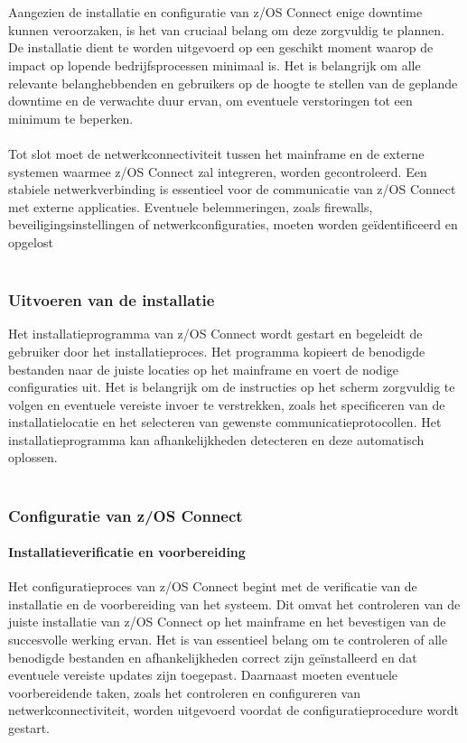 \\ \\
Aangezien de installatie en configuratie van z/OS Connect enige downtime kunnen veroorzaken, is het van cruciaal belang om deze zorgvuldig te plannen. De installatie dient te worden uitgevoerd op een geschikt moment waarop de impact op lopende bedrijfsprocessen minimaal is. Het is belangrijk om alle relevante belanghebbenden en gebruikers op de hoogte te stellen van de geplande downtime en de verwachte duur ervan, om eventuele verstoringen tot een minimum te beperken.  \autocite{Software2012}
\\ \\
Tot slot moet de netwerkconnectiviteit tussen het mainframe en de externe systemen waarmee z/OS Connect zal integreren, worden gecontroleerd. Een stabiele netwerkverbinding is essentieel voor de communicatie van z/OS Connect met externe applicaties. Eventuele belemmeringen, zoals firewalls, beveiligingsinstellingen of netwerkconfiguraties, moeten worden geïdentificeerd en opgelost  \autocite{Software2012}
\\ \\
\subsubsection{Uitvoeren van de installatie}
\label{sec:Uitvoeren van de installatie}
Het installatieprogramma van z/OS Connect wordt gestart en begeleidt de gebruiker door het installatieproces. Het programma kopieert de benodigde bestanden naar de juiste locaties op het mainframe en voert de nodige configuraties uit. Het is belangrijk om de instructies op het scherm zorgvuldig te volgen en eventuele vereiste invoer te verstrekken, zoals het specificeren van de installatielocatie en het selecteren van gewenste communicatieprotocollen. Het installatieprogramma kan afhankelijkheden detecteren en deze automatisch oplossen.  \autocite{Software2012}
\\ \\
\subsubsection{Configuratie van z/OS Connect}
\label{sec:Configuratie van z/OS Connect}
\paragraph{Installatieverificatie en voorbereiding}
Het configuratieproces van z/OS Connect begint met de verificatie van de installatie en de voorbereiding van het systeem. Dit omvat het controleren van de juiste installatie van z/OS Connect op het mainframe en het bevestigen van de succesvolle werking ervan. Het is van essentieel belang om te controleren of alle benodigde bestanden en afhankelijkheden correct zijn geïnstalleerd en dat eventuele vereiste updates zijn toegepast. Daarnaast moeten eventuele voorbereidende taken, zoals het controleren en configureren van netwerkconnectiviteit, worden uitgevoerd voordat de configuratieprocedure wordt gestart. \autocite{IBM2023c}
\\ \\
